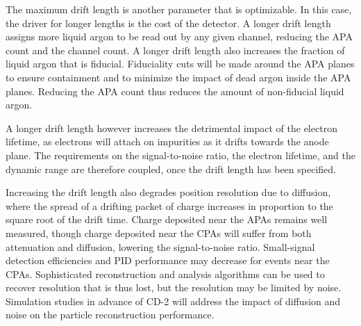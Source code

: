 The maximum drift length is another parameter that is optimizable.  In
this case, the driver for longer lengths is the cost of the detector.
A longer drift length assigns more liquid argon to be read out by any
given channel, reducing the APA count and the channel count.  A longer
drift length also increases the fraction of liquid argon that is
fiducial.  Fiduciality cuts will be made around the APA planes
to ensure containment and to minimize the impact of dead argon inside the APA
planes.  Reducing the APA count thus reduces the amount of non-fiducial
liquid argon.  

A longer drift length however increases the detrimental impact of the electron
lifetime, as electrons will attach on impurities as it drifts towards the
anode plane.  The requirements on the signal-to-noise ratio, the electron lifetime,
and the dynamic range are therefore coupled, once the drift length has been specified.

Increasing the drift length also degrades position resolution due to
diffusion, where the spread of a drifting packet of charge increases in
proportion to the square root of the drift time.  Charge deposited
near the APAs remains well measured, though charge deposited near the
CPAs will suffer from both attenuation and diffusion, lowering the
signal-to-noise ratio.  Small-signal detection efficiencies and PID
performance may decrease for events near the CPAs.
%
Sophisticated reconstruction and analysis algorithms can be used to
recover resolution that is thus lost, but the resolution may be limited by noise.
Simulation studies in advance of CD-2 will address the impact of
diffusion and noise on the particle reconstruction performance.
